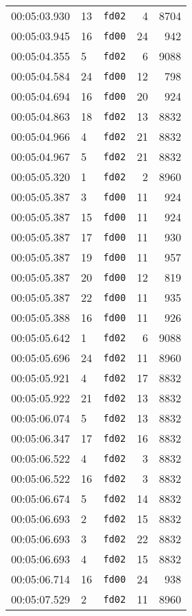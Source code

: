 \documentclass{article}
\begin{document}
\begin{longtable}{lllrr}
00:05:03.930 & 13 & \texttt{fd02} & 4 & 8704 \\
00:05:03.945 & 16 & \texttt{fd00} & 24 & 942 \\
00:05:04.355 & 5 & \texttt{fd02} & 6 & 9088 \\
00:05:04.584 & 24 & \texttt{fd00} & 12 & 798 \\
00:05:04.694 & 16 & \texttt{fd00} & 20 & 924 \\
00:05:04.863 & 18 & \texttt{fd02} & 13 & 8832 \\
00:05:04.966 & 4 & \texttt{fd02} & 21 & 8832 \\
00:05:04.967 & 5 & \texttt{fd02} & 21 & 8832 \\
00:05:05.320 & 1 & \texttt{fd02} & 2 & 8960 \\
00:05:05.387 & 3 & \texttt{fd00} & 11 & 924 \\
00:05:05.387 & 15 & \texttt{fd00} & 11 & 924 \\
00:05:05.387 & 17 & \texttt{fd00} & 11 & 930 \\
00:05:05.387 & 19 & \texttt{fd00} & 11 & 957 \\
00:05:05.387 & 20 & \texttt{fd00} & 12 & 819 \\
00:05:05.387 & 22 & \texttt{fd00} & 11 & 935 \\
00:05:05.388 & 16 & \texttt{fd00} & 11 & 926 \\
00:05:05.642 & 1 & \texttt{fd02} & 6 & 9088 \\
00:05:05.696 & 24 & \texttt{fd02} & 11 & 8960 \\
00:05:05.921 & 4 & \texttt{fd02} & 17 & 8832 \\
00:05:05.922 & 21 & \texttt{fd02} & 13 & 8832 \\
00:05:06.074 & 5 & \texttt{fd02} & 13 & 8832 \\
00:05:06.347 & 17 & \texttt{fd02} & 16 & 8832 \\
00:05:06.522 & 4 & \texttt{fd02} & 3 & 8832 \\
00:05:06.522 & 16 & \texttt{fd02} & 3 & 8832 \\
00:05:06.674 & 5 & \texttt{fd02} & 14 & 8832 \\
00:05:06.693 & 2 & \texttt{fd02} & 15 & 8832 \\
00:05:06.693 & 3 & \texttt{fd02} & 22 & 8832 \\
00:05:06.693 & 4 & \texttt{fd02} & 15 & 8832 \\
00:05:06.714 & 16 & \texttt{fd00} & 24 & 938 \\
00:05:07.529 & 2 & \texttt{fd02} & 11 & 8960 \\

\end{longtable}
\end{document}
